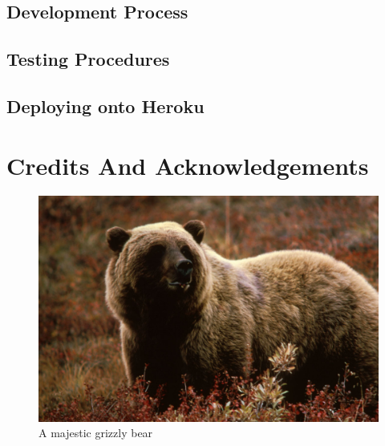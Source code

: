 \documentclass[10pt, a4paper, twocolumn]{article} %
\begin{document}
\subsection{Development Process}
\subsection{Testing Procedures}
\subsection{Deploying onto Heroku}
\section{Credits And Acknowledgements}

\begin{figure}
	\includegraphics[width=\linewidth]{bear.jpg} %
	\caption{A majestic grizzly bear} %
	\label{bear} %
\end{figure}


\printbibliography[title={Bibliography}] %

\end{document}

